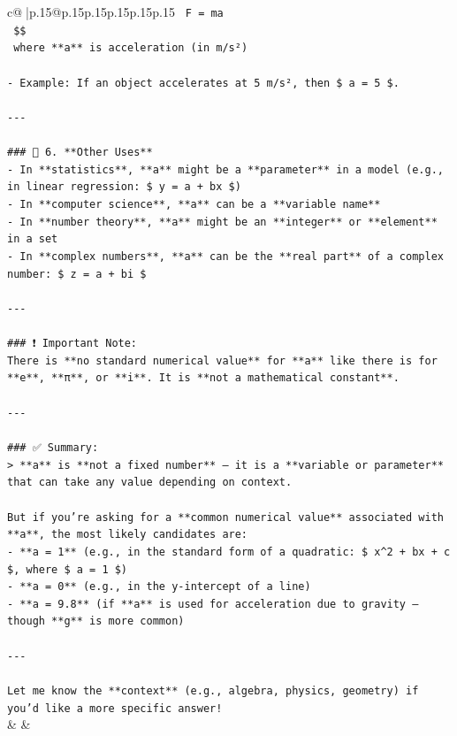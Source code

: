 \documentclass{article}
\begin{document}
{\begin{supertabular}{c@{$\;$}|p{.15\linewidth}@{}p{.15\linewidth}p{.15\linewidth}p{.15\linewidth}p{.15\linewidth}p{.15\linewidth}}
{{{\texttt{  F = ma} \\
\texttt{  \$\$} \\
\texttt{  where **a** is acceleration (in m/s²)} \\
\\ 
\texttt{{-} Example: If an object accelerates at 5 m/s², then \$ a = 5 \$.} \\
\\ 
\texttt{{-}{-}{-}} \\
\\ 
\texttt{\#\#\# 🔹 6. **Other Uses**} \\
\texttt{{-} In **statistics**, **a** might be a **parameter** in a model (e.g., in linear regression: \$ y = a + bx \$)} \\
\texttt{{-} In **computer science**, **a** can be a **variable name**} \\
\texttt{{-} In **number theory**, **a** might be an **integer** or **element** in a set} \\
\texttt{{-} In **complex numbers**, **a** can be the **real part** of a complex number: \$ z = a + bi \$} \\
\\ 
\texttt{{-}{-}{-}} \\
\\ 
\texttt{\#\#\# ❗ Important Note:} \\
\texttt{There is **no standard numerical value** for **a** like there is for **e**, **π**, or **i**. It is **not a mathematical constant**.} \\
\\ 
\texttt{{-}{-}{-}} \\
\\ 
\texttt{\#\#\# ✅ Summary:} \\
\texttt{> **a** is **not a fixed number** — it is a **variable or parameter** that can take any value depending on context.} \\
\\ 
\texttt{But if you're asking for a **common numerical value** associated with **a**, the most likely candidates are:} \\
\texttt{{-} **a = 1** (e.g., in the standard form of a quadratic: \$ x\^{}2 + bx + c \$, where \$ a = 1 \$)} \\
\texttt{{-} **a = 0** (e.g., in the y{-}intercept of a line)} \\
\texttt{{-} **a = 9.8** (if **a** is used for acceleration due to gravity — though **g** is more common)} \\
\\ 
\texttt{{-}{-}{-}} \\
\\ 
\texttt{Let me know the **context** (e.g., algebra, physics, geometry) if you'd like a more specific answer!} \\
            }
        }
    }
    & & \\ \\


\end{supertabular}}
\end{document}
